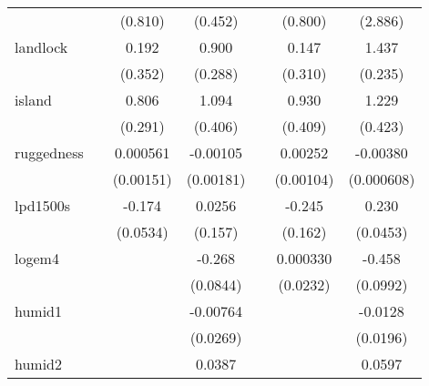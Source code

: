 {\begin{tabular}{l*{6}{c}}
            &                     &     (0.810)         &     (0.452)         &                     &     (0.800)         &     (2.886)         \\
[1em]
landlock    &                     &       0.192         &       0.900\sym{**} &                     &       0.147         &       1.437\sym{***}\\
            &                     &     (0.352)         &     (0.288)         &                     &     (0.310)         &     (0.235)         \\
[1em]
island      &                     &       0.806\sym{**} &       1.094\sym{*}  &                     &       0.930\sym{*}  &       1.229\sym{**} \\
            &                     &     (0.291)         &     (0.406)         &                     &     (0.409)         &     (0.423)         \\
[1em]
ruggedness  &                     &    0.000561         &    -0.00105         &                     &     0.00252\sym{*}  &    -0.00380\sym{***}\\
            &                     &   (0.00151)         &   (0.00181)         &                     &   (0.00104)         &  (0.000608)         \\
[1em]
lpd1500s    &                     &      -0.174\sym{**} &      0.0256         &                     &      -0.245         &       0.230\sym{***}\\
            &                     &    (0.0534)         &     (0.157)         &                     &     (0.162)         &    (0.0453)         \\
[1em]
logem4      &                     &                     &      -0.268\sym{**} &                     &    0.000330         &      -0.458\sym{***}\\
            &                     &                     &    (0.0844)         &                     &    (0.0232)         &    (0.0992)         \\
[1em]
humid1      &                     &                     &    -0.00764         &                     &                     &     -0.0128         \\
            &                     &                     &    (0.0269)         &                     &                     &    (0.0196)         \\
[1em]
humid2      &                     &                     &      0.0387         &                     &                     &      0.0597\sym{**} \\

\end{tabular}}
